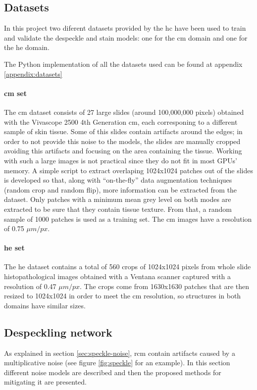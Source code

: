 \documentclass[../main.tex]{subfiles}
\begin{document}
\subsection{Datasets}
In this project two diferent datasets provided by the \gls{hc}
have been used to train and validate the despeckle and stain models:
one for the \gls{cm} domain and one for the \gls{he} domain.

The Python implementation of all the datasets used can be found at appendix
\ref{appendix:datasets}

\paragraph{\gls{cm} set}
The \gls{cm} dataset consists of 27 large slides (around 100,000,000 pixels)
obtained with the Vivascope 2500 4th Generation \gls{cm},
each corresponing to a different sample of skin tissue.
Some of this slides contain artifacts around the edges; in order to not
provide this noise to the models, the slides are manually cropped avoiding
this artifacts and focusing on the area containing the tissue.
Working with such a large images is not practical since they do not fit
in most GPUs' memory. A simple script to extract overlaping 1024x1024
patches out of the slides is developed so that, along with ``on-the-fly''
data augmentation techniques (random crop and random flip), more information
can be extracted from the dataset.
Only patches with a minimum mean grey level on both modes are extracted to
be sure that they contain tissue texture.
From that, a random sample of 1000 patches is used as a training set.
The \gls{cm} images have a resolution of 0.75 $\mu m / px$.

\paragraph{\gls{he} set}
The \gls{he} dataset contains a total of 560 crops of 1024x1024 pixels from
whole slide histopathological images obtained with a Ventana
scanner captured with a resolution of 0.47 $\mu m / px$. 
The crops come from 1630x1630 patches
that are then resized to 1024x1024 in order to meet the \gls{cm} resolution,
so structures in both domains have similar sizes.

\subsection{Despeckling network}
\label{sec:despeckling-network}
As explained in section \ref{sec:speckle-noise}, \gls{rcm} contain artifacts
caused by a multiplicative noise (see figure \ref{fig:speckle} for an example).
In this section different noise models are
described and then the proposed methods for mitigating it are presented.
\end{document}
